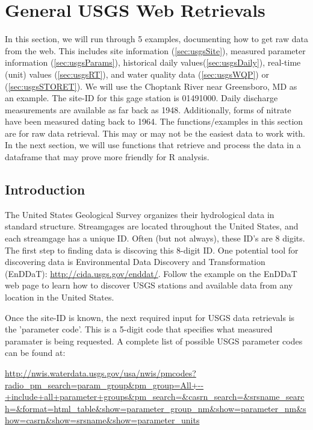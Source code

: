 \documentclass[a4paper,11pt]{article}
\begin{document}
\section{General USGS Web Retrievals}
In this section, we will run through 5 examples, documenting how to get raw data from the web. This includes site information (\ref{sec:usgsSite}), measured parameter information (\ref{sec:usgsParams}), historical daily values(\ref{sec:usgsDaily}), real-time (unit) values (\ref{sec:usgsRT}), and water quality data (\ref{sec:usgsWQP}) or (\ref{sec:usgsSTORET}). We will use the Choptank River near Greensboro, MD as an example.  The site-ID for this gage station is 01491000. Daily discharge measurements are available as far back as 1948.  Additionally, forms of nitrate have been measured dating back to 1964. The functions/examples in this section are for raw data retrieval.  This may or may not be the easiest data to work with.  In the next section, we will use functions that retrieve and process the data in a dataframe that may prove more friendly for R analysis.

\subsection{Introduction}
The United States Geological Survey organizes their hydrological data in standard structure.  Streamgages are located throughout the United States, and each streamgage has a unique ID.  Often (but not always), these ID's are 8 digits.  The first step to finding data is discoving this 8-digit ID. One potential tool for discovering data is Environmental Data Discovery and Transformation (EnDDaT): \url{http://cida.usgs.gov/enddat/}.  Follow the example on the EnDDaT web page to learn how to discover USGS stations and available data from any location in the United States. 

Once the site-ID is known, the next required input for USGS data retrievals is the 'parameter code'.  This is a 5-digit code that specifies what measured paramater is being requested.  A complete list of possible USGS parameter codes can be found at:

\url{http://nwis.waterdata.usgs.gov/usa/nwis/pmcodes?radio_pm_search=param_group&pm_group=All+--+include+all+parameter+groups&pm_search=&casrn_search=&srsname_search=&format=html_table&show=parameter_group_nm&show=parameter_nm&show=casrn&show=srsname&show=parameter_units}
\end{document}
